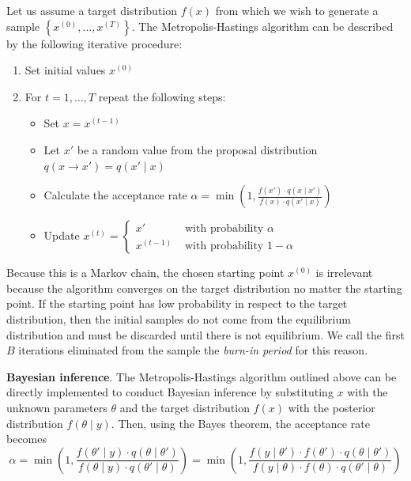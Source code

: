 \documentclass[11pt,fleqn]{book} %
\begin{document}
\begin{algorithm}
	Let us assume a target distribution $f(x)$ from which we wish to 
	generate a sample $\left\{x^{(0)},\dots,x^{(T)}\right\}$. The 
	Metropolis-Hastings algorithm can be described by the following 
	iterative procedure:
	\begin{enumerate}
		\item Set initial values $x^{(0)}$
		\item For $t=1,\dots,T$ repeat the following steps:
		\begin{itemize}
			\item Set $x=x^{(t-1)}$
			\item Let $x'$ be a random value from the proposal distribution 
			$q(x \to x')=q(x' \mid x)$
			\item Calculate the acceptance rate 
			$\alpha = \min\left(1,\frac{f(x') \cdot q(x \mid x')}{f(x) \cdot q(x' \mid x)}\right)$
			\item Update $x^{(t)}=\left\{
			\begin{array}{ll}
				x'        & \text{ with probability } \alpha   \\
				x^{(t-1)} & \text{ with probability } 1-\alpha 
			\end{array}\right.$ 
		\end{itemize}
	\end{enumerate}
\end{algorithm}

Because this is a Markov chain, the chosen starting point $x^{(0)}$ is 
irrelevant because the algorithm converges on the target distribution
no matter the starting point. If the starting point has low probability 
in respect to the target distribution, then the initial samples do not 
come from the equilibrium distribution and must be discarded until there 
is not equilibrium. We call the first $B$ iterations eliminated from the 
sample the \emph{burn-in period} for this reason.

\textbf{Bayesian inference}.
The Metropolis-Hastings algorithm outlined above can be directly implemented 
to conduct Bayesian inference by substituting $x$ with the unknown parameters 
$\theta$ and the target distribution $f(x)$ with the posterior distribution 
$f(\theta \mid y)$. Then, using the Bayes theorem, the acceptance rate 
becomes
\begin{displaymath}
	\alpha = \min\left(1,\frac{f(\theta' \mid y) \cdot q(\theta \mid \theta')}{f(\theta \mid y) \cdot q(\theta' \mid \theta)}\right) = \min\left(1,\frac{f(y \mid \theta') \cdot f(\theta') \cdot q(\theta \mid \theta')}{f(y \mid \theta)  \cdot f(\theta) \cdot q(\theta' \mid \theta)}\right)
\end{displaymath}
\end{document}
